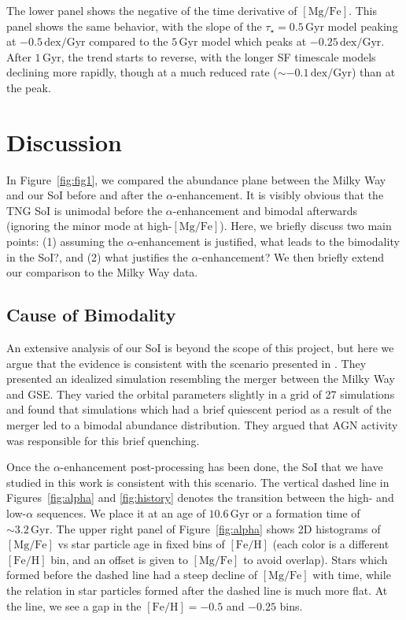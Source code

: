 \documentclass[linenumbers, twocolumn]{aastex631}
\newcommand{\Gyr}{\ensuremath{\textrm{Gyr}}}
\newcommand{\FeH}{\ensuremath{[\textrm{Fe}/\textrm{H}]}}
\newcommand{\MgFe}{\ensuremath{[\textrm{Mg}/\textrm{Fe}]}}
\newcommand{\dex}{\ensuremath{\textrm{dex}}}
\begin{document}
The lower panel shows the negative of the time derivative of \MgFe{}. This panel shows the same behavior, with the slope of the $\tau_{\star}=0.5\,\Gyr$ model peaking at $-0.5\,\dex/\Gyr$ compared to the $5\,\Gyr$ model which peaks at $-0.25\,\dex/\Gyr$. After $1\,\Gyr$, the trend starts to reverse, with the longer SF timescale models declining more rapidly, though at a much reduced rate ($\sim-0.1\,\dex/\Gyr$) than at the peak.

\section{Discussion}\label{sec:disc}
In Figure~\ref{fig:fig1}, we compared the abundance plane between the Milky Way and our SoI before and after the $\alpha$-enhancement. It is visibly obvious that the TNG SoI is unimodal before the $\alpha$-enhancement and bimodal afterwards (ignoring the minor mode at high-\MgFe{}). Here, we briefly discuss two main points: (1) assuming the $\alpha$-enhancement is justified, what leads to the bimodality in the SoI?, and (2) what justifies the $\alpha$-enhancement? We then briefly extend our comparison to the Milky Way data.

\subsection{Cause of Bimodality}\label{ssec:bim_cause}
An extensive analysis of our SoI is beyond the scope of this project, but here we argue that the evidence is consistent with the scenario presented in \citet{2024arXiv240707985B}. They presented an idealized simulation resembling the merger between the Milky Way and GSE. They varied the orbital parameters slightly in a grid of 27 simulations and found that simulations which had a brief quiescent period as a result of the merger led to a bimodal abundance distribution. They argued that AGN activity was responsible for this brief quenching.

Once the $\alpha$-enhancement post-processing has been done, the SoI that we have studied in this work is consistent with this scenario. The vertical dashed line in Figures~\ref{fig:alpha} and \ref{fig:history} denotes the transition between the high- and low-$\alpha$ sequences. We place it at an age of $10.6\,\Gyr$ or a formation time of $\sim3.2\,\Gyr$. The upper right panel of Figure~\ref{fig:alpha} shows 2D histograms of \MgFe{} vs star particle age in fixed bins of \FeH{} (each color is a different \FeH{} bin, and an offset is given to \MgFe{} to avoid overlap). Stars which formed before the dashed line had a steep decline of \MgFe{} with time, while the relation in star particles formed after the dashed line is much more flat. At the line, we see a gap in the $\FeH=-0.5$ and $-0.25$ bins.
\end{document}

